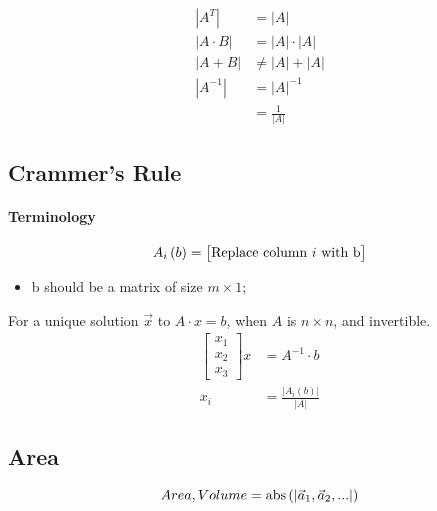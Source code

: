   \begin{align*}
    \left| A^{T} \right| &= \left| A \right| \\ 
    \left| A \cdot B \right| &= \left| A \right| \cdot \left| A \right| \\ 
    \left| A + B \right| &\ne \left| A \right| + \left| A \right| \\ 
    \left| A^{-1} \right| &= \left| A \right|^{-1} \\
    &= \frac{1}{\left| A \right|}
  \end{align*}

  \subsection{Crammer's Rule}
  
    \paragraph{Terminology}
    \begin{equation}
      A_{i} \left( b \right) = 
      \begin{bmatrix}
        \text{Replace column $ i $ with b}
      \end{bmatrix}
    \end{equation}
    
    \begin{itemize}
      \item b should be a matrix of size $ m \times 1 $;
    \end{itemize}
    
    \begin{definition}
      For a unique solution $ \vec{x} $ to $ A \cdot x = b $, when $ A $ 
      is $ n \times n $, and invertible.
      \begin{align}
        \begin{bmatrix}
          x_{1} \\ 
          x_{2} \\ 
          x_{3}
        \end{bmatrix}
        x &= A^{-1} \cdot b \\
        x_{i} &= \frac{ \left| A_{i} \left( b \right) \right| }{ \left| A \right| }
      \end{align}  
    \end{definition}
    
  \subsection{Area}
  
    \begin{equation}
      Area, Volume = \operatorname{abs} \left( \left| \vec{a}_{1}, \vec{a}_{2}, ... \right| \right)
    \end{equation}